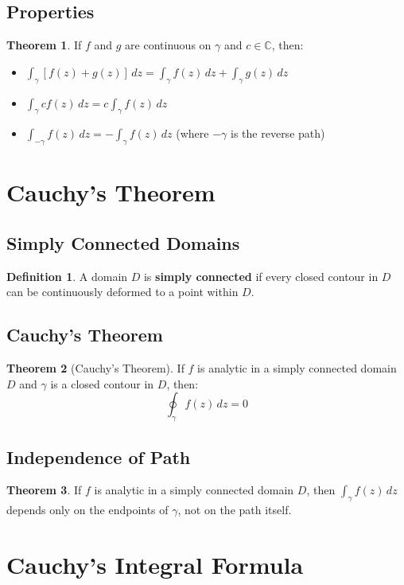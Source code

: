 \documentclass[11pt]{article}
\theoremstyle{definition}
\newtheorem{definition}{Definition}[section]
\newtheorem{theorem}{Theorem}[section]
\begin{document}
\subsection{Properties}
\begin{theorem}
If $f$ and $g$ are continuous on $\gamma$ and $c \in \mathbb{C}$, then:
\begin{itemize}
    \item $\int_\gamma [f(z) + g(z)] \, dz = \int_\gamma f(z) \, dz + \int_\gamma g(z) \, dz$
    \item $\int_\gamma cf(z) \, dz = c \int_\gamma f(z) \, dz$
    \item $\int_{-\gamma} f(z) \, dz = -\int_\gamma f(z) \, dz$ (where $-\gamma$ is the reverse path)
\end{itemize}
\end{theorem}

\section{Cauchy's Theorem}

\subsection{Simply Connected Domains}
\begin{definition}
A domain $D$ is \textbf{simply connected} if every closed contour in $D$ can be continuously deformed to a point within $D$.
\end{definition}

\subsection{Cauchy's Theorem}
\begin{theorem}[Cauchy's Theorem]
If $f$ is analytic in a simply connected domain $D$ and $\gamma$ is a closed contour in $D$, then:
$$\oint_\gamma f(z) \, dz = 0$$
\end{theorem}

\subsection{Independence of Path}
\begin{theorem}
If $f$ is analytic in a simply connected domain $D$, then $\int_\gamma f(z) \, dz$ depends only on the endpoints of $\gamma$, not on the path itself.
\end{theorem}

\section{Cauchy's Integral Formula}
\end{document}
